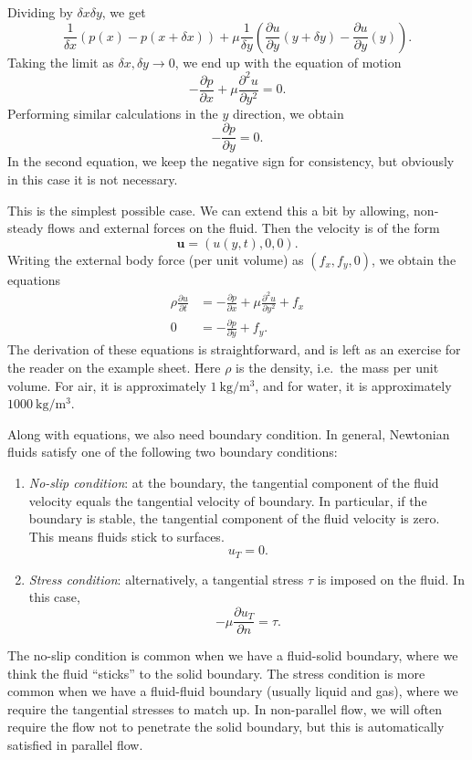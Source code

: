 \documentclass[a4paper]{article}
\begin{document}
Dividing by $\delta x \delta y$, we get
\[
  \frac{1}{\delta x}(p(x) - p(x + \delta x)) + \mu\frac{1}{\delta y}\left(\frac{\partial u}{\partial y}(y + \delta y) - \frac{\partial u}{\partial y}(y)\right).
\]
Taking the limit as $\delta x, \delta y \to 0$, we end up with the equation of motion
\[
  -\frac{\partial p}{\partial x} + \mu \frac{\partial^2 u}{\partial y^2} = 0.
\]
Performing similar calculations in the $y$ direction, we obtain
\[
  -\frac{\partial p}{\partial y} = 0.
\]
In the second equation, we keep the negative sign for consistency, but obviously in this case it is not necessary.

This is the simplest possible case. We can extend this a bit by allowing, non-steady flows and external forces on the fluid. Then the velocity is of the form
\[
  \mathbf{u} = (u(y, t), 0, 0).
\]
Writing the external body force (per unit volume) as $(f_x, f_y, 0)$, we obtain the equations
\begin{align*}
  \rho\frac{\partial u}{\partial t} &= -\frac{\partial p}{\partial x} + \mu \frac{\partial^2 u}{\partial y^2} + f_x\\
  0 &=-\frac{\partial p}{\partial y} + f_y.
\end{align*}
The derivation of these equations is straightforward, and is left as an exercise for the reader on the example sheet. Here $\rho$ is the density, i.e.\ the mass per unit volume. For air, it is approximately $\SI{1}{\kilo\gram\per\meter\cubed}$, and for water, it is approximately $\SI{1000}{\kilo\gram\per\meter\cubed}$.

Along with equations, we also need boundary condition. In general, Newtonian fluids satisfy one of the following two boundary conditions:

\begin{enumerate}
  \item \emph{No-slip condition}: at the boundary, the tangential component of the fluid velocity equals the tangential velocity of boundary. In particular, if the boundary is stable, the tangential component of the fluid velocity is zero. This means fluids stick to surfaces.
    \[
      u_T = 0.\tag{1.5}
    \]
  \item \emph{Stress condition}: alternatively, a tangential stress $\tau$ is imposed on the fluid. In this case,
    \[
      -\mu \frac{\partial u_T}{\partial n} = \tau.
    \]
\end{enumerate}
The no-slip condition is common when we have a fluid-solid boundary, where we think the fluid ``sticks'' to the solid boundary. The stress condition is more common when we have a fluid-fluid boundary (usually liquid and gas), where we require the tangential stresses to match up. In non-parallel flow, we will often require the flow not to penetrate the solid boundary, but this is automatically satisfied in parallel flow.
\end{document}
